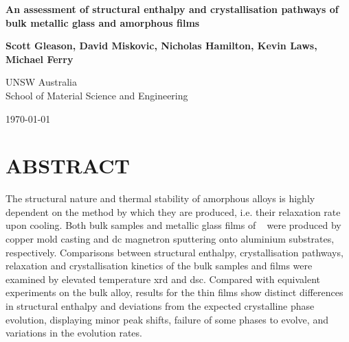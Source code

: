\documentclass[a4paper,12pt,oneside]{article}%
\begin{document}
\thispagestyle{empty} %
\begin{titlepage}
\begin{center}
\vspace*{1cm}
	
\textbf{\LARGE{An assessment of structural enthalpy and crystallisation pathways of \MgZnCa~ bulk metallic glass and amorphous films}}

\vspace{2cm}

\textbf{Scott Gleason, David Miskovic, Nicholas Hamilton, Kevin Laws, Michael Ferry}

\vspace{2cm}

UNSW Australia\\ School of Material Science and Engineering

\vspace{2cm}

\today
\end{center}
\end{titlepage}

\clearpage 
{}


\section*{ABSTRACT}

The structural nature and thermal stability of amorphous alloys is highly dependent on the method by which they are produced, i.e. their relaxation rate upon cooling.  Both bulk samples and metallic glass films of \MgZnCa~ were produced by copper mold casting and \gls{dc} magnetron sputtering onto aluminium substrates, respectively. Comparisons between structural enthalpy, crystallisation pathways, relaxation and crystallisation kinetics of the bulk samples and films were examined by elevated temperature \acrshort{xrd} and \acrshort{dsc}. Compared with equivalent experiments on the bulk alloy, results for the thin films show distinct differences in structural enthalpy and deviations from the expected crystalline phase evolution, displaying minor peak shifts, failure of some phases to evolve, and variations in the evolution rates. 

\end{document}
